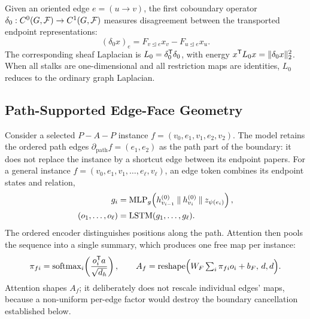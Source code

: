 Given an oriented edge $e=(u\rightarrow v)$, the first coboundary operator
$\delta_0:C^0(G,\mathcal{F})\rightarrow C^1(G,\mathcal{F})$ measures disagreement between the transported endpoint
representations:
\begin{equation}
  (\delta_0x)_e
  =
  F_{v\unlhd e}x_v-F_{u\unlhd e}x_u.
  \label{eq:background-delta0}
\end{equation}
The corresponding sheaf Laplacian is
$L_0=\delta_0^{\mathsf{T}}\delta_0$, with energy
$x^{\mathsf{T}}L_0x=\lVert\delta_0x\rVert_2^2$. When all stalks are one-dimensional and all
restriction maps are identities, $L_0$ reduces to the ordinary graph Laplacian.

\subsection{Path-Supported Edge-Face Geometry}
\label{sec:face-geometry}

Consider a selected \(P\!-\!A\!-\!P\) instance
\(f=(v_0,e_1,v_1,e_2,v_2)\).  The model retains the ordered path edges
\(\partial_{\mathrm{path}}f=(e_1,e_2)\) as the path part of the boundary: it does not replace the instance by
a shortcut edge between its endpoint papers.  For a general instance
\(f=(v_0,e_1,v_1,\ldots,e_\ell,v_\ell)\), an edge token combines its endpoint states and relation,
\begin{equation}
  \begin{aligned}
  g_i&=\operatorname{MLP}_g\!\left(
    h_{v_{i-1}}^{(0)}\mathbin\Vert h_{v_i}^{(0)}\mathbin\Vert z_{\psi(e_i)}
  \right),\\
  (o_1,\ldots,o_\ell)&=\operatorname{LSTM}(g_1,\ldots,g_\ell).
  \end{aligned}
\end{equation}
The ordered encoder distinguishes positions along the path.  Attention then pools the sequence into
a single summary, which produces one free map per instance:
\begin{equation}
  \pi_{fi}
  =\operatorname{softmax}_{i}\!\left(
    \frac{o_i^{\mathsf{T}}a}{\sqrt{d_h}}
  \right),
  \qquad
  A_f
  =\operatorname{reshape}\!\Big(W_F\textstyle\sum_i\pi_{fi}o_i+b_F,\,d,d\Big).
  \label{eq:face-map}
\end{equation}
Attention shapes \(A_f\); it deliberately does not rescale individual edges' maps, because a
non-uniform per-edge factor would destroy the boundary cancellation established below.

